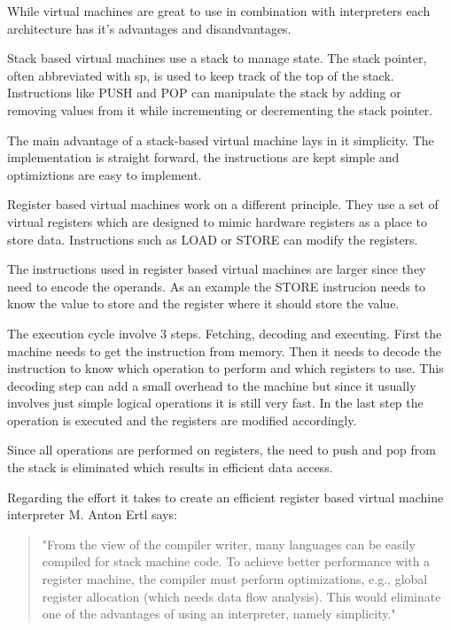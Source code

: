 \documentclass{article}
\begin{document}
While virtual machines are great to use in combination with interpreters
each architecture has it's advantages and disandvantages.

Stack based virtual machines use a stack to manage state. The stack pointer,
often abbreviated with sp, is used to keep track of the top of the stack.
Instructions like PUSH and POP can manipulate the stack by adding or removing
values from it while incrementing or decrementing the stack pointer.

The main advantage of a stack-based virtual machine lays in it simplicity.
The implementation is straight forward, the instructions are kept simple
and optimiztions are easy to implement.

Register based virtual machines work on a different principle. They use a set of
virtual registers which are designed to mimic hardware registers as a place to
store data. Instructions such as LOAD or STORE can modify the registers.

The instructions used in register based virtual machines are larger since they
need to encode the operands. As an example the STORE instrucion needs to know 
the value to store and the register where it should store the value.

The execution cycle involve 3 steps. Fetching, decoding and executing. First
the machine needs to get the instruction from memory. Then it needs to decode
the instruction to know which operation to perform and which registers to use.
This decoding step can add a small overhead to the machine but since it usually
involves just simple logical operations it is still very fast. In the last step
the operation is executed and the registers are modified accordingly.

Since all operations are performed on registers, the need to push and pop from
the stack is eliminated which results in efficient data access.

Regarding the effort it takes to create an efficient register based virtual
machine interpreter M. Anton Ertl says:

\begin{quotation}
"From the view of the compiler writer, many languages can be easily compiled for
stack machine code. To achieve better performance with a register machine, the
compiler must perform optimizations, e.g., global register allocation (which
needs data flow analysis). This would eliminate one of the advantages of using an
interpreter, namely simplicity." ~\cite{stack_caching_for_interpreters}
\end{quotation}
\end{document}
